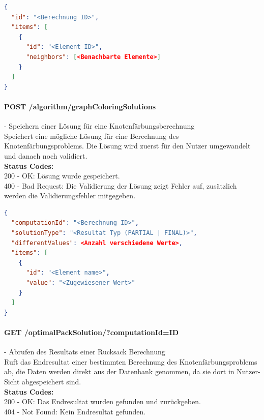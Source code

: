 \begin{lstlisting}[language=JSON, caption=Beispiel für Eingabedaten des Knotenfärbungsproblems für den Algorithmus, label=lst:input_graphcoloring_algo]  
{
  "id": "<Berechnung ID>",
  "items": [
    {
      "id": "<Element ID>",
      "neighbors": [<Benachbarte Elemente>]
    }
  ]
}
\end{lstlisting}

\paragraph{POST /algorithm/graphColoringSolutions} - Speichern einer Lösung für eine Knotenfärbungsberechnung\mbox{}\\
Speichert eine mögliche Lösung für eine Berechnung des Knotenfärbungsproblems. Die Lösung wird zuerst für den Nutzer umgewandelt und danach noch validiert.\\
\textbf{Status Codes:}\\
200 - OK: Lösung wurde gespeichert.\\
400 - Bad Request: Die Validierung der Lösung zeigt Fehler auf, zusätzlich werden die Validierungsfehler mitgegeben.\\

\begin{lstlisting}[language=JSON, caption=Beispiel eines Resultates für das Knotenfärbungsproblems aus Algorithmus-Sicht, label=lst:solution_graphcoloring_algo]  
{
  "computationId": "<Berechnung ID>",
  "solutionType": "<Resultat Typ (PARTIAL | FINAL)>",
  "differentValues": <Anzahl verschiedene Werte>,
  "items": [
    {
      "id": "<Element name>",
      "value": "<Zugewiesener Wert>"
    }
  ]
}
\end{lstlisting}

\paragraph{GET /optimalPackSolution/?computationId={ID}} - Abrufen des Resultats einer Rucksack Berechnung\mbox{}\\
Ruft das Endresultat einer bestimmten Berechnung des Knotenfärbungsproblems ab, die Daten werden direkt aus der Datenbank genommen, da sie dort in Nutzer-Sicht abgespeichert sind.\\
\textbf{Status Codes:}\\
200 - OK: Das Endresultat wurden gefunden und zurückgeben.\\
404 - Not Found: Kein Endresultat gefunden.\\

